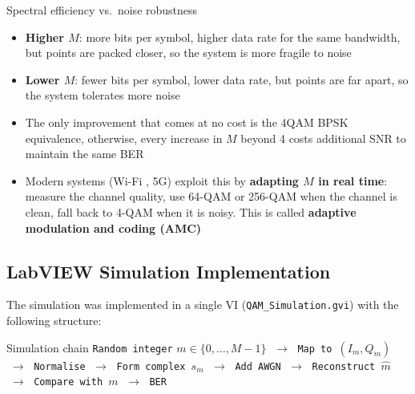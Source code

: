\begin{KeyBox}{Spectral efficiency vs.\ noise robustness}
\begin{itemize}
\item \textbf{Higher $M$}: more bits per symbol, higher data rate for the same bandwidth, but points are packed closer, so the system is more fragile to noise
\item \textbf{Lower $M$}: fewer bits per symbol, lower data rate,  but points are far apart, so the system tolerates more noise
\item The only improvement that comes at no cost is the 4QAM BPSK equivalence, otherwise, every increase in $M$ beyond 4 costs additional SNR to maintain the same BER
\item Modern systems (Wi-Fi , 5G) exploit this by \textbf{adapting $M$ in real time}: measure the channel quality, use 64-QAM or 256-QAM when the channel is clean, fall back to 4-QAM when it is noisy. This is called \textbf{adaptive modulation and coding (AMC)}
\end{itemize}
\end{KeyBox}

\subsection{LabVIEW Simulation Implementation}

The simulation was implemented in a single VI (\texttt{QAM\_Simulation.gvi}) with the following structure:

\begin{SummaryBox}{Simulation chain}
\texttt{Random integer} $m \in \{0, \ldots, M-1\}$ $\;\rightarrow\;$ \texttt{Map to $(I_m, Q_m)$} $\;\rightarrow\;$ \texttt{Normalise} $\;\rightarrow\;$ \texttt{Form complex $s_m$} $\;\rightarrow\;$ \texttt{Add AWGN} $\;\rightarrow\;$ \texttt{Reconstruct $\hat{m}$} $\;\rightarrow\;$ \texttt{Compare with $m$} $\;\rightarrow\;$ \texttt{BER}
\end{SummaryBox}

